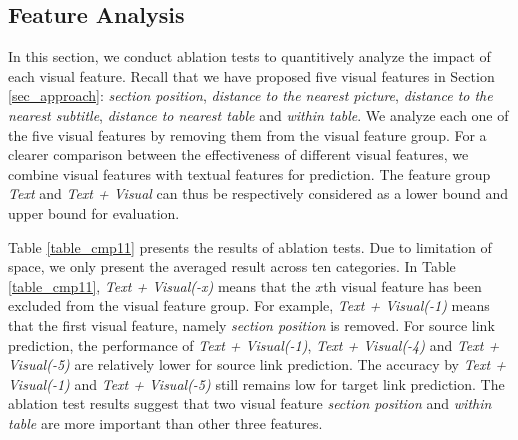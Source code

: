\subsection{Feature Analysis}

In this section, we conduct ablation tests to quantitively analyze the impact of each visual feature. Recall that we have proposed five visual features in Section \ref{sec_approach}: \emph{section position}, \emph{distance to the nearest picture}, \emph{distance to the nearest subtitle}, \emph{distance to nearest table} and \emph{within table}. We analyze each one of the five visual features by removing them from the visual feature group. For a clearer comparison between the effectiveness of different visual features, we combine visual features with textual features for prediction. The feature group \emph{Text} and \emph{Text + Visual} can thus be respectively considered as a lower bound and upper bound for evaluation. 

Table \ref{table_cmp11} presents the results of ablation tests. Due to limitation of space, we only present the averaged result across ten categories. In Table \ref{table_cmp11}, \emph{Text + Visual(-x)} means that the $x$th visual feature has been excluded from the visual feature group. For example, \emph{Text + Visual(-1)} means that the first visual feature, namely \emph{section position} is removed. For source link prediction, the performance of \emph{Text + Visual(-1)}, \emph{Text + Visual(-4)} and \emph{Text + Visual(-5)} are relatively lower for source link prediction. The accuracy by \emph{Text + Visual(-1)} and \emph{Text + Visual(-5)} still remains low for target link prediction. The ablation test results suggest that two visual feature \emph{section position} and \emph{within table} are more important than other three features.